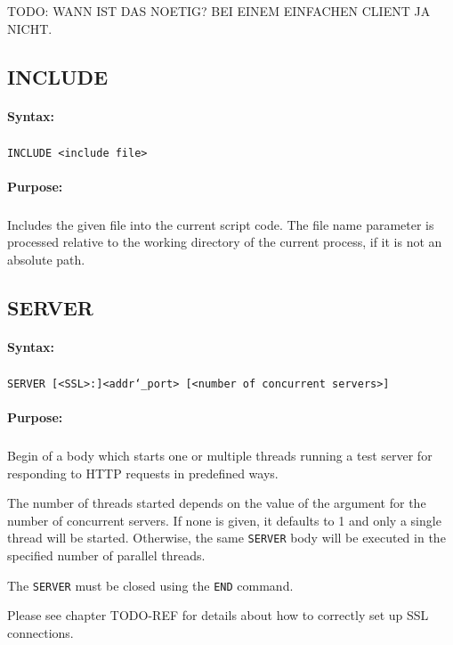 TODO: WANN IST DAS NOETIG? BEI EINEM EINFACHEN CLIENT JA NICHT.


\subsection{INCLUDE}

\paragraph{Syntax:}
\subparagraph{}
\texttt{INCLUDE <include file>}

\paragraph{Purpose:}
\subparagraph{}
Includes the given file into the current script code. The file name parameter 
is processed relative to the working directory of the current process, if it 
is not an absolute path.


\subsection{SERVER}

\paragraph{Syntax:}
\subparagraph{}
\texttt{SERVER [<SSL>:]<addr\char`\_port> [<number of concurrent servers>]}

\paragraph{Purpose:}
\subparagraph{}
Begin of a body which starts one or multiple threads running a test server for responding  
to HTTP requests in predefined ways.

The number of threads started depends on the value of the argument for 
the number of concurrent servers. If none is given, it defaults to 1 and 
only a single thread will be started. Otherwise, the same \texttt{SERVER} body will 
be executed in the specified number of parallel threads.

The \texttt{SERVER} must be closed using the \texttt{END} command.

Please see chapter TODO-REF for details about how to correctly set up SSL connections.


